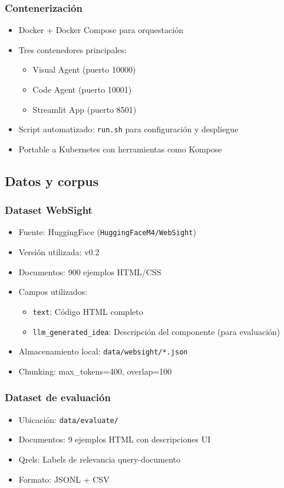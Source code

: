 \documentclass[12pt,a4paper]{article}
\begin{document}
\subsubsection{Contenerización}
\begin{itemize}
    \item Docker + Docker Compose para orquestación
    \item Tres contenedores principales:
    \begin{itemize}
        \item Visual Agent (puerto 10000)
        \item Code Agent (puerto 10001)
        \item Streamlit App (puerto 8501)
    \end{itemize}
    \item Script automatizado: \texttt{run.sh} para configuración y despliegue
    \item Portable a Kubernetes con herramientas como Kompose
\end{itemize}

\subsection{Datos y corpus}

\subsubsection{Dataset WebSight}
\begin{itemize}
    \item Fuente: HuggingFace (\texttt{HuggingFaceM4/WebSight})
    \item Versión utilizada: v0.2
    \item Documentos: 900 ejemplos HTML/CSS
    \item Campos utilizados:
    \begin{itemize}
        \item \texttt{text}: Código HTML completo
        \item \texttt{llm\_generated\_idea}: Descripción del componente (para evaluación)
    \end{itemize}
    \item Almacenamiento local: \texttt{data/websight/*.json}
    \item Chunking: max\_tokens=400, overlap=100
\end{itemize}

\subsubsection{Dataset de evaluación}
\begin{itemize}
    \item Ubicación: \texttt{data/evaluate/}
    \item Documentos: 9 ejemplos HTML con descripciones UI
    \item Qrels: Labels de relevancia query-documento
    \item Formato: JSONL + CSV
\end{itemize}
\end{document}
